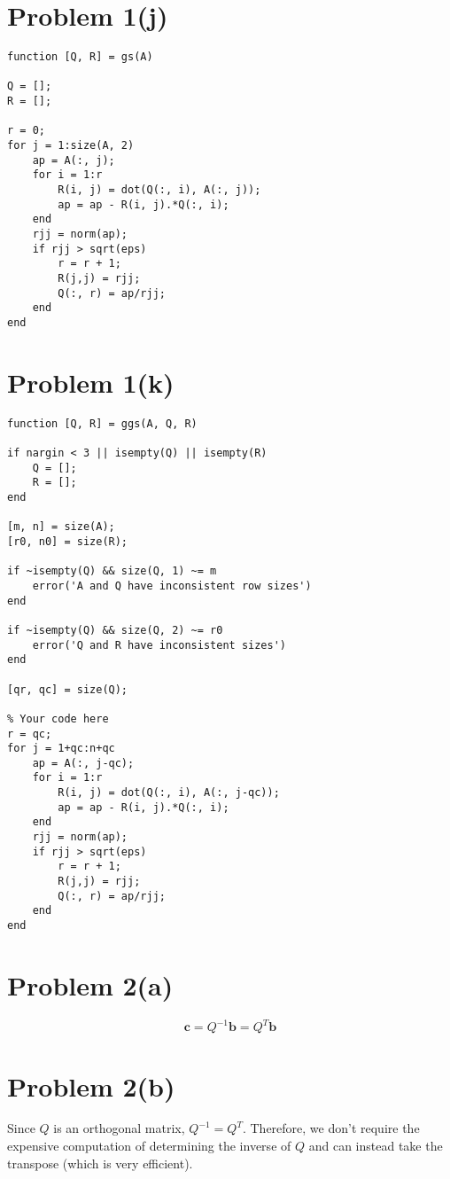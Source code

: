 \documentclass{article}
\begin{document}
\section*{Problem 1(j)}

\begin{verbatim}
function [Q, R] = gs(A)

Q = [];
R = [];

r = 0;
for j = 1:size(A, 2)
    ap = A(:, j);
    for i = 1:r
        R(i, j) = dot(Q(:, i), A(:, j));
        ap = ap - R(i, j).*Q(:, i);
    end
    rjj = norm(ap);
    if rjj > sqrt(eps)
        r = r + 1;
        R(j,j) = rjj;
        Q(:, r) = ap/rjj;
    end
end
\end{verbatim}

\section*{Problem 1(k)}

\begin{verbatim}
function [Q, R] = ggs(A, Q, R)

if nargin < 3 || isempty(Q) || isempty(R)
    Q = [];
    R = [];
end

[m, n] = size(A);
[r0, n0] = size(R);

if ~isempty(Q) && size(Q, 1) ~= m
    error('A and Q have inconsistent row sizes')
end

if ~isempty(Q) && size(Q, 2) ~= r0
    error('Q and R have inconsistent sizes')
end

[qr, qc] = size(Q);

% Your code here
r = qc;
for j = 1+qc:n+qc
    ap = A(:, j-qc);
    for i = 1:r
        R(i, j) = dot(Q(:, i), A(:, j-qc));
        ap = ap - R(i, j).*Q(:, i);
    end
    rjj = norm(ap);
    if rjj > sqrt(eps)
        r = r + 1;
        R(j,j) = rjj;
        Q(:, r) = ap/rjj;
    end
end
\end{verbatim}

\section*{Problem 2(a)}

$$ \mathbf{c} = Q^{-1}\mathbf{b} = Q^{T}\mathbf{b}$$

\section*{Problem 2(b)}

Since $Q$ is an orthogonal matrix, $Q^{-1} = Q^{T}$. Therefore, we don't require the expensive computation of determining the inverse of $Q$ and can instead take the transpose (which is very efficient).
\end{document}
